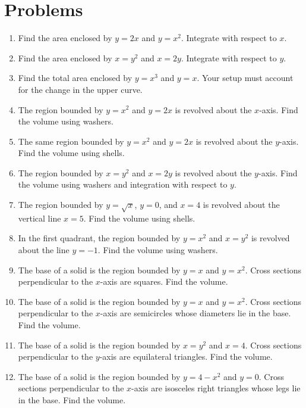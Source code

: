 \documentclass[12pt]{article}
\begin{document}
\section*{Problems}
\begin{enumerate}[leftmargin=*,itemsep=1.1em]
  \item Find the area enclosed by $y=2x$ and $y=x^2$. Integrate with respect to $x$.

  \item Find the area enclosed by $x=y^2$ and $x=2y$. Integrate with respect to $y$.

  \item Find the total area enclosed by $y=x^3$ and $y=x$. Your setup must account for the change in the upper curve.

  \item The region bounded by $y=x^2$ and $y=2x$ is revolved about the $x$-axis. Find the volume using washers.

  \item The same region bounded by $y=x^2$ and $y=2x$ is revolved about the $y$-axis. Find the volume using shells.

  \item The region bounded by $x=y^2$ and $x=2y$ is revolved about the $y$-axis. Find the volume using washers and integration with respect to $y$.

  \item The region bounded by $y=\sqrt{x}$, $y=0$, and $x=4$ is revolved about the vertical line $x=5$. Find the volume using shells.

  \item In the first quadrant, the region bounded by $y=x^2$ and $x=y^2$ is revolved about the line $y=-1$. Find the volume using washers.

  \item The base of a solid is the region bounded by $y=x$ and $y=x^2$. Cross sections perpendicular to the $x$-axis are squares. Find the volume.

  \item The base of a solid is the region bounded by $y=x$ and $y=x^2$. Cross sections perpendicular to the $x$-axis are semicircles whose diameters lie in the base. Find the volume.

  \item The base of a solid is the region bounded by $x=y^2$ and $x=4$. Cross sections perpendicular to the $y$-axis are equilateral triangles. Find the volume.

  \item The base of a solid is the region bounded by $y=4-x^2$ and $y=0$. Cross sections perpendicular to the $x$-axis are isosceles right triangles whose legs lie in the base. Find the volume.
\end{enumerate}
\end{document}
